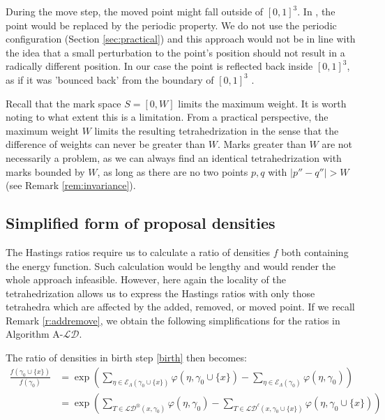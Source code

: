 

During the move step, the moved point might fall outside of $[0,1]^3$. In \cite{DereudreLavancier2011}, the point would be replaced by the periodic property. We do not use the periodic configuration (Section \ref{sec:practical}) and this approach would not be in line with the idea that a small perturbation to the point's position should not result in a radically different position. 
In our case the point is reflected back inside $[0,1]^3$, as if it was 'bounced back' from the boundary of $[0,1]^3$ .

\begin{remark}
Recall that the mark space $S=[0,W]$ limits the maximum weight. It is worth noting to what extent this is a limitation. From a practical perspective, the maximum weight $W$ limits the resulting tetrahedrization in the sense that the difference of weights can never be greater than $W$. Marks greater than $W$ are not necessarily a problem, as we can always find an identical tetrahedrization with marks bounded by $W$, as long as there are no two points $p,q$ with $|p''-q''|>W$ (see Remark \ref{rem:invariance}).
\end{remark}


\subsection{Simplified form of proposal densities}
The Hastings ratios require us to calculate a ratio of densities $f$ both containing the energy function. Such calculation would be lengthy and would render the whole approach infeasible. However, here again the locality of the tetrahedrization allows us to express the Hastings ratios with only those tetrahedra which are affected by the added, removed, or moved point. If we recall Remark \ref{r:addremove}, we obtain the following simplifications for the ratios in Algorithm A-$\mathcal {LD}$.

The ratio of densities in birth step \eqref{birth} then becomes:
\begin{align*}
\frac{f(\gamma_0 \cup\{x\})}{f(\gamma_0)} &= \exp\left({\sum_{\eta\in \mathcal E_\Lambda(\gamma_0 \cup\{x\})} \varphi(\eta,\gamma_0 \cup\{x\}) - \sum_{\eta\in \mathcal E_\Lambda(\gamma_0)}\varphi(\eta,\gamma_0)}\right) \\
&= \exp\left(  \sum_{T \in \mathcal {LD}^\otimes (x,\gamma_0)} \varphi(\eta,\gamma_0)  - \sum_{T\in \mathcal {LD}^\ell (x,\gamma_0 \cup\{x\})} \varphi(\eta,\gamma_0 \cup\{x\}) \right)  
\end{align*}

